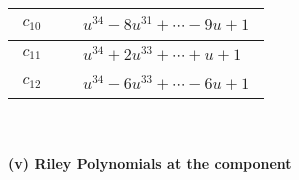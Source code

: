 \documentclass[1p]{elsarticle_modified}
\theoremstyle{definition}
\begin{document}
\begin{tabular}{m{50pt}|m{274pt}}
\hline $$\begin{aligned}c_{10}\end{aligned}$$&$\begin{aligned}
&u^{34}-8 u^{31}+\cdots-9 u+1
\end{aligned}$\\
\hline $$\begin{aligned}c_{11}\end{aligned}$$&$\begin{aligned}
&u^{34}+2 u^{33}+\cdots+u+1
\end{aligned}$\\
\hline $$\begin{aligned}c_{12}\end{aligned}$$&$\begin{aligned}
&u^{34}-6 u^{33}+\cdots-6 u+1
\end{aligned}$\\
\hline
\end{tabular}\\~\\
\newpage\renewcommand{\arraystretch}{1}
\flushleft \textbf{(v) Riley Polynomials at the component}\newline \\
\end{document}
